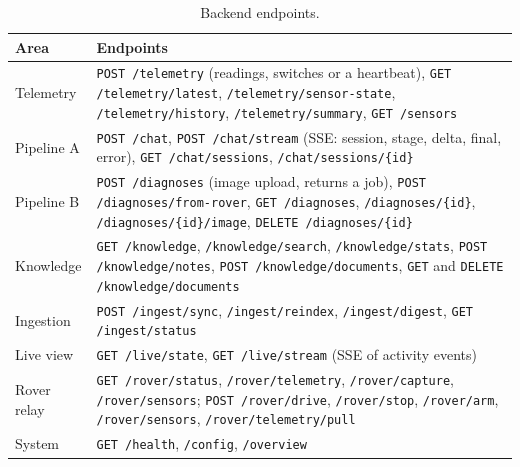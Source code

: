 \begin{table}[H]
\centering
\caption{Backend endpoints.}
\small
\begin{tabular}{|P{2.5cm}|P{10.3cm}|}
\hline
\textbf{Area} & \textbf{Endpoints}\\\hline
Telemetry & \texttt{POST /telemetry} (readings, switches or a heartbeat), \texttt{GET /telemetry/latest}, \texttt{/telemetry/sensor-state}, \texttt{/telemetry/history}, \texttt{/telemetry/summary}, \texttt{GET /sensors}\\\hline
Pipeline A & \texttt{POST /chat}, \texttt{POST /chat/stream} (SSE: session, stage, delta, final, error), \texttt{GET /chat/sessions}, \texttt{/chat/sessions/\{id\}}\\\hline
Pipeline B & \texttt{POST /diagnoses} (image upload, returns a job), \texttt{POST /diagnoses/from-rover}, \texttt{GET /diagnoses}, \texttt{/diagnoses/\{id\}}, \texttt{/diagnoses/\{id\}/image}, \texttt{DELETE /diagnoses/\{id\}}\\\hline
Knowledge & \texttt{GET /knowledge}, \texttt{/knowledge/search}, \texttt{/knowledge/stats}, \texttt{POST /knowledge/notes}, \texttt{POST /knowledge/documents}, \texttt{GET} and \texttt{DELETE /knowledge/documents}\\\hline
Ingestion & \texttt{POST /ingest/sync}, \texttt{/ingest/reindex}, \texttt{/ingest/digest}, \texttt{GET /ingest/status}\\\hline
Live view & \texttt{GET /live/state}, \texttt{GET /live/stream} (SSE of activity events)\\\hline
Rover relay & \texttt{GET /rover/status}, \texttt{/rover/telemetry}, \texttt{/rover/capture}, \texttt{/rover/sensors}; \texttt{POST /rover/drive}, \texttt{/rover/stop}, \texttt{/rover/arm}, \texttt{/rover/sensors}, \texttt{/rover/telemetry/pull}\\\hline
System & \texttt{GET /health}, \texttt{/config}, \texttt{/overview}\\\hline
\end{tabular}
\end{table}
